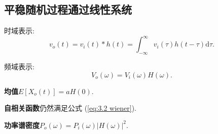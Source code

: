\subsection{平稳随机过程通过线性系统}
时域表示:
\begin{equation}
    v_o(t)=v_i(t)*h(t)=\int_{-\infty}^{\infty}v_i(\tau)h(t-\tau)\mathrm{d}\tau.
\end{equation}

频域表示:
\begin{equation}
    V_o(\omega)=V_i(\omega)H(\omega).
\end{equation}

\textbf{均值}\quad $E[X_o(t)]=aH(0)$.

\textbf{自相关函数}\quad 仍然满足公式 (\ref{eq:3.2 wiener}).

\textbf{功率谱密度}\quad $P_o(\omega)=P_i(\omega)|H(\omega)|^2$.
